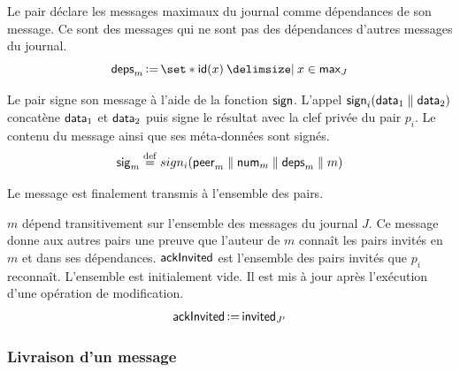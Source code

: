 Le pair déclare les messages maximaux du journal comme dépendances de son message.
Ce sont des messages qui ne sont pas des dépendances d'autres messages du journal.
%
\begin{equation*}
    \trm{deps}_m \assign \set*{\trm{id}(x) \given x \in \trm{max}_J}
\end{equation*}

Le pair signe son message à l'aide de la fonction $\operatorname{\mathsf{sign}}$.
L'appel $\operatorname{\mathsf{sign}}_i(\operatorname{\mathsf{data}}_1 \parallel \operatorname{\mathsf{data}}_2)$ concatène $\operatorname{\mathsf{data}}_1$ et $\operatorname{\mathsf{data}}_2$ puis signe le résultat avec la clef privée du pair $p_i$.
Le contenu du message ainsi que ses méta-données sont signés.
%
%
\begin{equation*}
    \operatorname{\mathsf{sig}}_m \overset{\mathrm{def}}{=} sign_i(\operatorname{\mathsf{peer}}_m \parallel \operatorname{\mathsf{num}}_m \parallel \operatorname{\mathsf{deps}}_m \parallel m)
\end{equation*}

Le message est finalement transmis à l'ensemble des pairs.

$m$ dépend transitivement sur l'ensemble des messages du journal $J$.
Ce message donne aux autres pairs une preuve que l'auteur de $m$ connaît les pairs invités en $m$ et dans ses dépendances.
$\operatorname{\mathsf{ackInvited}}$ est l'ensemble des pairs invités que $p_i$ reconnaît.
L'ensemble est initialement vide.
Il est mis à jour après l'exécution d'une opération de modification.
%
\begin{equation*}
    \operatorname{\mathsf{ackInvited}} \operatorname{\vcentcolon=} \operatorname{\mathsf{invited}}_{J'}
\end{equation*}


\subsubsection{Livraison d'un message}


